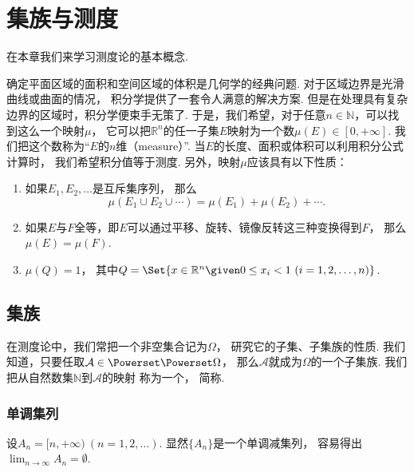 \chapter{集族与测度}
在本章我们来学习测度论的基本概念.

确定平面区域的面积和空间区域的体积是几何学的经典问题.
对于区域边界是光滑曲线或曲面的情况，
积分学提供了一套令人满意的解决方案.
但是在处理具有复杂边界的区域时，积分学便束手无策了.
于是，我们希望，对于任意\(n\in\mathbb{N}\)，可以找到这么一个映射\(\mu\)，
它可以把\(\mathbb{R}^n\)的任一子集\(E\)映射为一个数\(\mu(E) \in [0,+\infty]\).
我们把这个数称为“\(E\)的\(n\)维（measure）”.
当\(E\)的长度、面积或体积可以利用积分公式计算时，
我们希望积分值等于测度.
另外，映射\(\mu\)应该具有以下性质：\begin{enumerate}
	\item 如果\(E_1,E_2,\dotsc\)是互斥集序列，
	那么\[
		\mu(E_1 \cup E_2 \cup \dotsb)
		= \mu(E_1) + \mu(E_2) + \dotsb.
	\]

	\item 如果\(E\)与\(F\)全等，即\(E\)可以通过平移、旋转、镜像反转这三种变换得到\(F\)，
	那么\(\mu(E) = \mu(F)\).

	\item \(\mu(Q)=1\)，
	其中\(Q = \Set{ x\in\mathbb{R}^n \given 0\leq x_i<1\ (i=1,2,\dotsc,n) }\).
\end{enumerate}

\section{集族}
在测度论中，我们常把一个非空集合记为\(\Omega\)，
研究它的子集、子集族的性质.
我们知道，只要任取\(\mathcal{A} \in \Powerset\Powerset\Omega\)，
那么\(\mathcal{A}\)就成为\(\Omega\)的一个子集族.
我们把从自然数集\(\mathbb{N}\)到\(\mathcal{A}\)的映射
称为一个，
简称.

\subsection{单调集列}
\begin{example}
设\(A_n = [n,+\infty)\ (n=1,2,\dotsc)\).
显然\(\{A_n\}\)是一个单调减集列，
容易得出\(\lim_{n\to\infty} A_n = \emptyset\).
\end{example}

